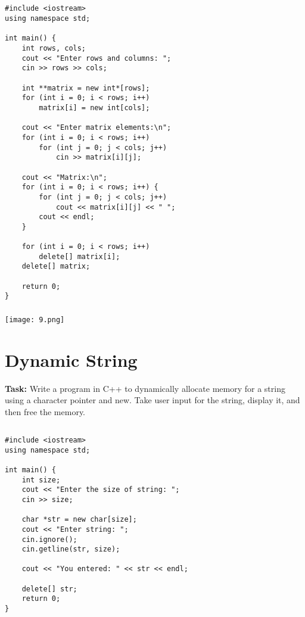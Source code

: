 \documentclass[12pt,a4paper]{article}
\begin{document}
\subsection{}
\begin{lstlisting}
#include <iostream>
using namespace std;

int main() {
    int rows, cols;
    cout << "Enter rows and columns: ";
    cin >> rows >> cols;

    int **matrix = new int*[rows];
    for (int i = 0; i < rows; i++)
        matrix[i] = new int[cols];

    cout << "Enter matrix elements:\n";
    for (int i = 0; i < rows; i++)
        for (int j = 0; j < cols; j++)
            cin >> matrix[i][j];

    cout << "Matrix:\n";
    for (int i = 0; i < rows; i++) {
        for (int j = 0; j < cols; j++)
            cout << matrix[i][j] << " ";
        cout << endl;
    }

    for (int i = 0; i < rows; i++)
        delete[] matrix[i];
    delete[] matrix;

    return 0;
}

\end{lstlisting}

\subsubsection{}
\begin{center}
    \texttt{[image: 9.png]}
\end{center}


\section{Dynamic String }
\textbf{Task:} Write a program in C++ to dynamically allocate memory for a string using a character pointer and new. Take user input for the string, display it, and then free the memory. 

\subsection{}
\begin{lstlisting}
#include <iostream>
using namespace std;

int main() {
    int size;
    cout << "Enter the size of string: ";
    cin >> size;

    char *str = new char[size];
    cout << "Enter string: ";
    cin.ignore();
    cin.getline(str, size);

    cout << "You entered: " << str << endl;

    delete[] str;
    return 0;
}

\end{lstlisting}
\end{document}
